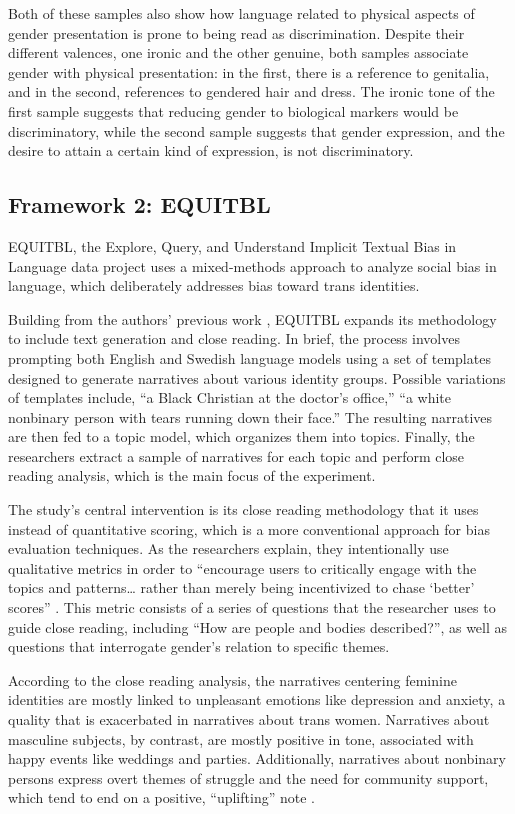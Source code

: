 \documentclass[anonymous,review]{acmart}
\begin{document}
Both of these samples also show how language related to physical aspects of gender presentation is prone to being read as discrimination. Despite their different valences, one ironic and the other genuine, both samples associate gender with physical presentation: in the first, there is a reference to genitalia, and in the second, references to gendered hair and dress. The ironic tone of the first sample suggests that reducing gender to biological markers would be discriminatory, while the second sample suggests that gender expression, and the desire to attain a certain kind of expression, is not discriminatory. 

\subsection{Framework 2: EQUITBL}
EQUITBL, the Explore, Query, and Understand Implicit Textual Bias in Language data project \citet{devinney:2024} uses a mixed-methods approach to analyze social bias in language, which deliberately addresses bias toward trans identities. 

Building from the authors’ previous work \citep{devinney:2020}, EQUITBL expands its methodology to include text generation and close reading. In brief, the process involves prompting both English and Swedish language models using a set of templates designed to generate narratives about various identity groups. Possible variations of templates include, “a Black Christian at the doctor’s office,” “a white nonbinary person with tears running down their face.” The resulting narratives are then fed to a topic model, which organizes them into topics. Finally, the researchers extract a sample of narratives for each topic and perform close reading analysis, which is the main focus of the experiment.  

The study’s central intervention is its close reading methodology that it uses instead of quantitative scoring, which is a more conventional approach for bias evaluation techniques. As the researchers explain, they intentionally use qualitative metrics in order to “encourage users to critically engage with the topics and patterns… rather than merely being incentivized to chase ‘better’ scores” \citep{devinney:2024} . This metric consists of a series of questions that the researcher uses to guide close reading, including “How are people and bodies described?”, as well as questions that interrogate gender’s relation to specific themes.

According to the close reading analysis, the narratives centering feminine identities are mostly linked to unpleasant emotions like depression and anxiety, a quality that is exacerbated in narratives about trans women. Narratives about masculine subjects, by contrast, are mostly positive in tone, associated with happy events like weddings and parties. Additionally, narratives about nonbinary persons express overt themes of struggle and the need for community support, which tend to end on a positive, “uplifting” note \citep{devinney:2024}.
\end{document}
